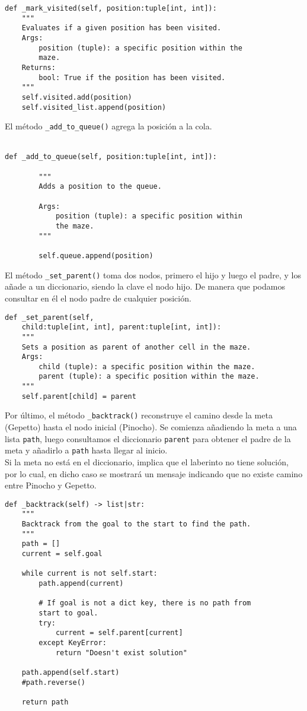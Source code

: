 \begin{lstlisting}
def _mark_visited(self, position:tuple[int, int]):
    """
    Evaluates if a given position has been visited.
    Args:
        position (tuple): a specific position within the
        maze.
    Returns:
        bool: True if the position has been visited.
    """
    self.visited.add(position)
    self.visited_list.append(position)

\end{lstlisting}
\clearpage
El método \lstinline{_add_to_queue()} agrega la posición a la cola.\\\
\begin{lstlisting}
def _add_to_queue(self, position:tuple[int, int]):

        """
        Adds a position to the queue.

        Args:
            position (tuple): a specific position within 
            the maze.
        """
        
        self.queue.append(position)

\end{lstlisting}
El método \lstinline{_set_parent()} toma dos nodos, primero el hijo y luego el padre, y los añade a un diccionario, siendo la clave el nodo hijo. De manera que podamos consultar en él el nodo padre de cualquier posición.\\
\begin{lstlisting}
def _set_parent(self,
    child:tuple[int, int], parent:tuple[int, int]):
    """
    Sets a position as parent of another cell in the maze.
    Args:
        child (tuple): a specific position within the maze.
        parent (tuple): a specific position within the maze.
    """
    self.parent[child] = parent
\end{lstlisting}
\clearpage
Por último, el método \lstinline{_backtrack()} reconstruye el camino desde la meta (Gepetto) hasta el nodo inicial (Pinocho). Se comienza añadiendo la meta a una lista \lstinline{path}, luego consultamos el diccionario \lstinline{parent} para obtener el padre de la meta y añadirlo a \lstinline{path} hasta llegar al inicio.
\\\newline
Si la meta no está en el diccionario, implica que el laberinto no tiene solución, por lo cual, en dicho caso se mostrará un mensaje indicando que no existe camino entre Pinocho y Gepetto.\\
\begin{lstlisting}
def _backtrack(self) -> list|str:
    """
    Backtrack from the goal to the start to find the path.
    """
    path = []
    current = self.goal

    while current is not self.start:
        path.append(current)

        # If goal is not a dict key, there is no path from
        start to goal.
        try:
            current = self.parent[current]
        except KeyError:
            return "Doesn't exist solution"

    path.append(self.start)
    #path.reverse()

    return path
\end{lstlisting}
\clearpage

